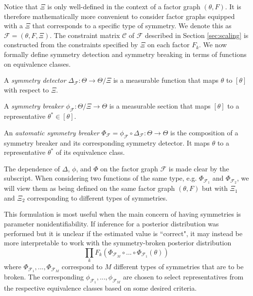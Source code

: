 Notice that $\Xi$ is only well-defined in the context of a factor graph $(\theta,F)$. It is therefore mathematically more convenient to consider factor graphs equipped with a $\Xi$ that corresponds to a specific type of symmetry. We denote this as $\mathcal{F}=(\theta,F,\Xi)$. The constraint matrix $\mathcal{C}$ of $\mathcal{F}$ described in Section \ref{sec:scaling} is constructed from the constraints specified by $\Xi$ on each factor $F_k$.  We now formally define symmetry detection and symmetry breaking in terms of functions on equivalence classes.

\begin{defn}
A \textit{symmetry detector} $\Delta_\mathcal{F}:\Theta\rightarrow\Theta/\Xi$ is a measurable function that maps $\theta$ to $[\theta]$ with respect to $\Xi$.
\end{defn}

\begin{defn}
A \textit{symmetry breaker} $\phi_\mathcal{F}:\Theta/\Xi\rightarrow\Theta$ is a measurable section that maps $[\theta]$ to a representative $\theta^*\in[\theta]$.
\end{defn}

\begin{defn}
An \textit{automatic symmetry breaker} $\Phi_\mathcal{F}=\phi_\mathcal{F}\circ\Delta_\mathcal{F}:\Theta\rightarrow\Theta$ is the composition of a symmetry breaker and its corresponding symmetry detector. It maps $\theta$ to a representative $\theta^*$ of its equivalence class.
\end{defn}

The dependence of $\Delta$, $\phi$, and $\Phi$ on the factor graph $\mathcal{F}$ is made clear by the subscript. When considering two functions of the same type, e.g. $\Phi_{\mathcal{F}_1}$ and $\Phi_{\mathcal{F}_2}$, we will view them as being defined on the same factor graph $(\theta,F)$ but with $\Xi_1$ and $\Xi_2$ corresponding to different types of symmetries.

This formulation is most useful when the main concern of having symmetries is parameter nonidentifiability. If inference for a posterior distribution was performed but it is unclear if the estimated value is ``correct", it may instead be more interpretable to work with the symmetry-broken posterior distribution
\[
\prod_kF_k(\Phi_{\mathcal{F}_M}\circ ...\circ\Phi_{\mathcal{F}_1}(\theta))
\]
where $\Phi_{\mathcal{F}_1},...,\Phi_{\mathcal{F}_M}$ correspond to $M$ different types of symmetries that are to be broken. The corresponding $\phi_{\mathcal{F}_1},...,\phi_{\mathcal{F}_M}$ are chosen to select representatives from the respective equivalence classes based on some desired criteria.

